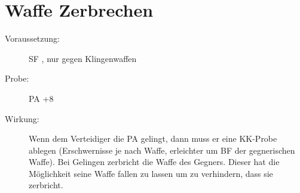 \section{Waffe Zerbrechen}
\label{bPA.waffe_zerbrechen}
\begin{description}
    \item[Voraussetzung:]
        SF , nur gegen Klingenwaffen
    \item[Probe:]
        PA +8
    \item[Wirkung:]
        Wenn dem Verteidiger die PA gelingt, dann muss er eine KK-Probe ablegen (Erschwernisse je nach Waffe, erleichter um BF der gegnerischen Waffe).
        Bei Gelingen zerbricht die Waffe des Gegners.
        Dieser hat die Möglichkeit seine Waffe fallen zu lassen um zu verhindern, dass sie zerbricht.
\end{description}
